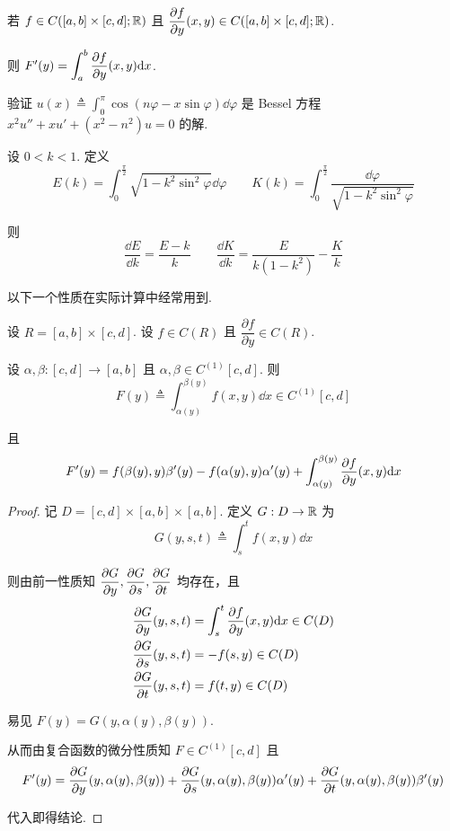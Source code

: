 \begin{inference}
    若 $f\in C([a,b]\times[c,d];\mathbb{R})$ 且 $\dfrac{\partial f}{\partial y}(x,y)\in C([a,b]\times[c,d];\mathbb{R})$.

    则 $F'(y)=\displaystyle\int_a^b\frac{\partial{f}}{\partial{y}}(x,y)\mathrm{d} x$.
\end{inference}

\begin{example}
    验证 $u(x)\triangleq\displaystyle\int_0^\pi\cos(n\varphi-x\sin\varphi)\dd\varphi$ 是 Bessel 方程 $x^2u''+xu'+(x^2-n^2)u=0$ 的解.
\end{example}

\begin{example}
    设 $0<k<1$. 定义
$$
E(k)=\int_0^\frac{\pi}{2}\sqrt{1-k^2\sin^2\varphi}\dd\varphi\qquad K(k)=\int_0^\frac{\pi}{2}\frac{\dd\varphi}{\sqrt{1-k^2\sin^2\varphi}}
$$

    则
$$
\frac{\dd E}{\dd k}=\frac{E-k}{k}\qquad\frac{\dd K}{\dd k}=\frac{E}{k(1-k^2)}-\frac{K}{k}
$$
\end{example}

以下一个性质在实际计算中经常用到.

\begin{property}
    设 $R=[a,b]\times[c,d]$. 设 $f\in C(R)$ 且 $\dfrac{\partial f}{\partial y}\in C(R)$.

    设 $\alpha,\beta:[c,d]\to[a,b]$ 且 $\alpha,\beta\in C^{(1)}[c,d]$. 则
$$
F(y)\triangleq\int_{\alpha(y)}^{\beta(y)}f(x,y)\dd x\in C^{(1)}[c,d]
$$

    且
$$
F'(y)=f(\beta(y),y)\beta'(y)-f(\alpha(y),y)\alpha'(y)+\int_{\alpha(y)}^{\beta(y)}\frac{\partial{f}}{\partial{y}}(x,y)\mathrm{d} x
$$
\end{property}
\begin{proof}
    记 $D=[c,d]\times[a,b]\times[a,b]$. 定义 $G:D\to\mathbb{R}$ 为
$$
G(y,s,t)\triangleq\int_s^tf(x,y)\dd x
$$

    则由前一性质知 $\displaystyle\frac{\partial{G}}{\partial{y}},\frac{\partial{G}}{\partial{s}},\frac{\partial{G}}{\partial{t}}$ 均存在，且
$$
\begin{aligned}
    &\frac{\partial{G}}{\partial{y}}(y,s,t)=\int_s^t\frac{\partial{f}}{\partial{y}}(x,y)\mathrm{d} x\in C(D)\\
    &\frac{\partial{G}}{\partial{s}}(y,s,t)=-f(s,y)\in C(D)\\
    &\frac{\partial{G}}{\partial{t}}(y,s,t)=f(t,y)\in C(D)
\end{aligned}
$$

    易见 $F(y)=G(y,\alpha(y),\beta(y))$.

    从而由复合函数的微分性质知 $F\in C^{(1)}[c,d]$ 且
$$
F'(y)=\frac{\partial{G}}{\partial{y}}(y,\alpha(y),\beta(y))+\frac{\partial{G}}{\partial{s}}(y,\alpha(y),\beta(y))\alpha'(y)+\frac{\partial{G}}{\partial{t}}(y,\alpha(y),\beta(y))\beta'(y)
$$

    代入即得结论.
\end{proof}

